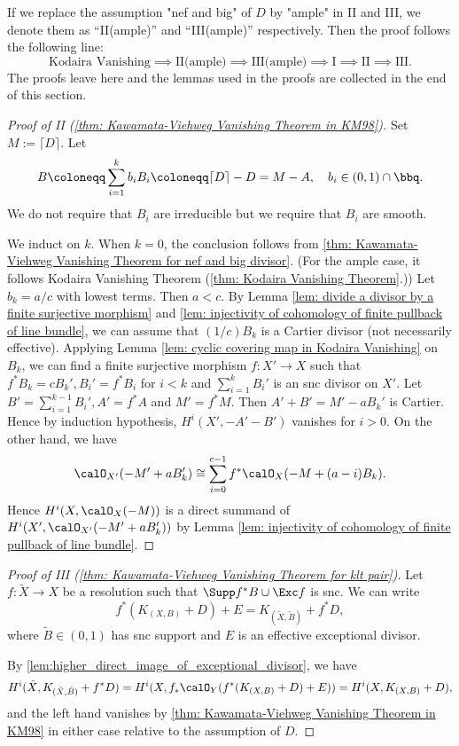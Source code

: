     If we replace the assumption "nef and big" of \(D\) by "ample" in II and III, we denote them as ``II(ample)'' and ``III(ample)'' respectively.
    Then the proof follows the following line:
    \[ \text{Kodaira Vanishing} \implies \text{II(ample)} \implies \text{III(ample)} \implies \text{I} \implies \text{II} \implies \text{III}. \]
    The proofs leave here and the lemmas used in the proofs are collected in the end of this section.
    
    \begin{proof}[Proof of II (\cref{thm: Kawamata-Viehweg Vanishing Theorem in KM98})]
        Set \(M:= \lceil D \rceil\).
        Let 
        \[ B \coloneqq \sum_{i=1}^k b_i B_i \coloneqq \lceil D \rceil - D = M - A, \quad b_i \in (0,1) \cap \bbq. \]
        We do not require that \(B_i\) are irreducible but we require that \(B_i\) are smooth.

        We induct on \(k\).
        When \(k = 0\), the conclusion follows from \cref{thm: Kawamata-Viehweg Vanishing Theorem for nef and big divisor}.
        (For the ample case, it follows Kodaira Vanishing Theorem (\cref{thm: Kodaira Vanishing Theorem}.))
        Let \(b_k = a/c\) with lowest terms.
        Then \(a<c\).
        By Lemma \ref{lem: divide a divisor by a finite surjective morphism} and \ref{lem: injectivity of cohomology of finite pullback of line bundle}, we can assume that \((1/c)B_k\) is a Cartier divisor (not necessarily effective).
        Applying Lemma \ref{lem: cyclic covering map in Kodaira Vanishing} on \(B_k\),
        we can find a finite surjective morphism \(f: X' \to X\) such that \(f^*B_k = cB_k', B_i' = f^*B_i\) for \(i < k\) and \(\sum_{i=1}^{k} B_i'\) is an snc divisor on \(X'\).
        Let \(B' = \sum_{i=1}^{k-1}B_i', A' = f^*A\) and \(M' = f^*M\).
        Then \(A'+ B' =  M'-aB_k'\) is Cartier.
        Hence by induction hypothesis, \( H^i(X', -A' - B')\) vanishes for \(i > 0\).
        On the other hand, we have
        \[ \calO_{X'}(-M' + aB_k') \cong \sum_{i=0}^{c-1} f^*\calO_X(-M + (a-i) B_k). \]
        Hence \(H^i(X,\calO_X(-M))\) is a direct summand of \(H^i(X', \calO_{X'}(-M' + aB_k'))\) by Lemma \ref{lem: injectivity of cohomology of finite pullback of line bundle}.
    \end{proof}
    \begin{proof}[Proof of III (\cref{thm: Kawamata-Viehweg Vanishing Theorem for klt pair})]
        Let \(f: \tilde{X} \to X\) be a resolution such that \(\Supp f^*B \cup \Exc f\) is snc.
        We can write
        \[ f^*(K_{(X,B)} + D) + E = K_{(\tilde{X},\tilde{B})} + f^*D, \]
        where \(\tilde{B} \in (0,1)\) has snc support and \(E\) is an effective exceptional divisor.

        By \cref{lem:higher_direct_image_of_exceptional_divisor}, we have 
        \[ H^i(\tilde{X}, K_{(\tilde{X},\tilde{B})} + f^*D) = H^i(X, f_*\calO_Y(f^*(K_{(X,B)}+D)+E)) = H^i(X, K_{(X,B)}+D), \] 
        and the left hand vanishes by \cref{thm: Kawamata-Viehweg Vanishing Theorem in KM98} in either case relative to the assumption of \(D\).
    \end{proof}
